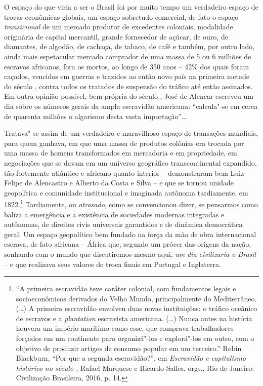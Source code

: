 O espaço do que viria a ser o Brasil foi por muito tempo um verdadeiro
espaço de trocas econômicas globais, um espaço sobretudo comercial, de
fato o espaço \emph{transicional} de um mercado produtor de excedentes
coloniais, modalidade originária de capital mercantil, grande fornecedor
de açúcar, de ouro, de diamantes, de algodão, de cachaça, de tabaco, de
café e também, por outro lado, ainda mais espetacular mercado comprador
de uma massa de 5 ou 6 milhões de escravos africanos, fora os mortos, ao
longo de 350 anos -- 42\% dos quais foram caçados, vencidos em guerras e
trazidos ao então novo país na primeira metade do século , contra
todos os tratados de suspensão do tráfico até então assinados. Em outra
opinião possível, bem própria do século , José de Alencar escreveu um
dia sobre os números gerais da ampla escravidão americana: ``calcula"-se
em cerca de quarenta milhões o algarismo desta vasta importação''\ldots{}

Tratava"-se assim de um verdadeiro e maravilhoso espaço de transações
mundiais, para quem ganhava, em que uma massa de produtos colônias era
trocada por uma massa de homens transformados em mercadoria e em
propriedade, em negociações que se davam em um universo geográfico
transcontinental expandido, tão fortemente atlântico e africano quanto
interior -- demonstraram bem Luiz Felipe de Alencastro e Alberto da
Costa e Silva -- e que se tornou unidade geopolítica e comunidade
institucional e imaginada autônoma tardiamente, em 1822.\footnote{``A
  primeira escravidão teve caráter colonial, com fundamentos legais e
  socioeconômicos derivados do Velho Mundo, principalmente do
  Mediterrâneo. (\ldots{}) A primeira escravidão envolveu duas novas
  instituições: o tráfico oceânico de escravos e a \emph{plantation}
  escravista americana. (\ldots{}) Nunca antes na história houvera um império
  marítimo como esse, que comprava trabalhadores forçados em um
  continente para organizá"-los e explorá"-los em outro, com o objetivo de
  produzir artigos de consumo popular em um terceiro.'' Robin Blackburn,
  ``Por que a segunda escravidão?'', em \emph{Escravidão e capitalismo
  histórico no século ,} Rafael Marquese e Ricardo Salles, orgs., Rio
  de Janeiro: Civilização Brasileira, 2016, p. 14.} Tardiamente, ou
\emph{atrasado}, como se convencionou dizer, se pensarmos como baliza a
emergência e a existência de sociedades modernas integradas e autônomas,
de direitos civis universais garantidos e de dinâmica democrática geral.
Um espaço geopolítico bem fundado na força da mão de obra internacional
escrava, de fato africana -- África que, segundo um prócer das origens
da nação, sonhando com o mundo que discutiremos mesmo aqui, \emph{um}
\emph{dia civilizaria o Brasil} -- e que realizava seus valores de troca
finais em Portugal e Inglaterra.

